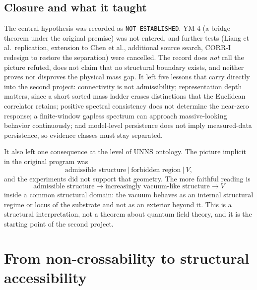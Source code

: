 \documentclass[11pt,a4paper]{article}
\theoremstyle{definition}
\theoremstyle{remark}
\newcommand{\uns}{UNNS}
\begin{document}
\subsection{Closure and what it taught}
The central hypothesis was recorded as \texttt{NOT ESTABLISHED}. YM-4 (a bridge theorem under the original premise) was not entered, and further tests (Liang et al.\ replication, extension to Chen et al., additional source search, CORR-I redesign to restore the separation) were cancelled. The record does \emph{not} call the picture refuted, does not claim that no structural boundary exists, and neither proves nor disproves the physical mass gap. It left five lessons that carry directly into the second project: connectivity is not admissibility; representation depth matters, since a short sorted mass ladder erases distinctions that the Euclidean correlator retains; positive spectral consistency does not determine the near-zero response; a finite-window gapless spectrum can approach massive-looking behavior continuously; and model-level persistence does not imply measured-data persistence, so evidence classes must stay separated.

It also left one consequence at the level of \uns{} ontology. The picture implicit in the original program was
\[
\text{admissible structure}\ \Big|\ \text{forbidden region}\ \Big|\ V ,
\]
and the experiments did not support that geometry. The more faithful reading is
\[
\text{admissible structure}\longrightarrow\text{increasingly vacuum-like structure}\longrightarrow V
\]
inside a common structural domain: the vacuum behaves as an internal structural regime or locus of the substrate and not as an exterior beyond it. This is a structural interpretation, not a theorem about quantum field theory, and it is the starting point of the second project.

\section{From non-crossability to structural accessibility}\label{sec:pivot}
\end{document}
